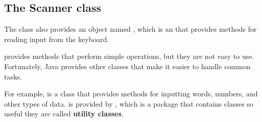 




\subsection{The Scanner class}




The  class also provides an object named , which is an  that provides methods for reading input from the keyboard.

 provides methods that perform simple operations, but they
are not easy to use.
Fortunately, Java provides other classes that make it easier to handle common tasks.


For example,  is a class that provides methods for
inputting words, numbers, and other types of data.  
is provided by , which is a package that contains
classes so useful they are called {\bf utility classes}.


